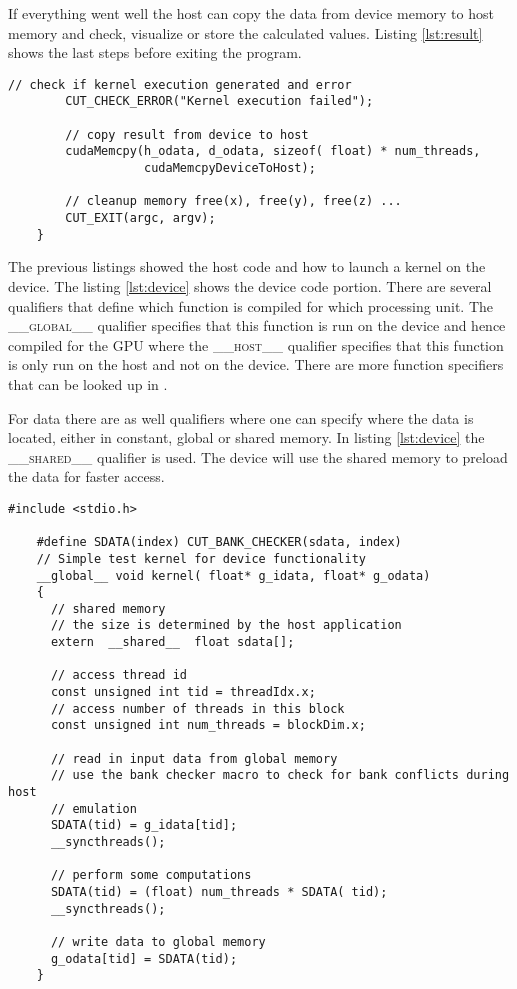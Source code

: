 If everything went well the host can copy the data from device memory
to host memory and check, visualize or store the calculated values. Listing
\ref{lst:result} shows the last steps before exiting the program.


\begin{lstlisting}[caption=Retrieving of the Results, label=lst:result]
	    // check if kernel execution generated and error
	    CUT_CHECK_ERROR("Kernel execution failed");
 
	    // copy result from device to host
	    cudaMemcpy(h_odata, d_odata, sizeof( float) * num_threads, 
			       cudaMemcpyDeviceToHost);

	    // cleanup memory free(x), free(y), free(z) ...
		CUT_EXIT(argc, argv);
	}
\end{lstlisting}



The previous listings showed the host code and how to launch a kernel on the
device. The listing \ref{lst:device} shows the device code portion. There are
several qualifiers that define which function is compiled for which processing
unit. The \textsc{\_\_global\_\_} qualifier specifies that this function is run
on the device and hence compiled for the \gls{GPU} where the \textsc{\_\_host\_\_}
qualifier specifies that this function is only run on the host and not on the
device. There are more function specifiers that can be looked up in
\cite{citeulike:3325943}.

For data there are as well qualifiers where one can specify where the data is
located, either in constant, global or shared memory. In listing
\ref{lst:device} the \textsc{\_\_shared\_\_} qualifier is used. The device will
use the shared memory to preload the data for faster access.


\begin{lstlisting}[caption=CUDA device code, label=lst:device]
	#include <stdio.h>

	#define SDATA(index) CUT_BANK_CHECKER(sdata, index)
	// Simple test kernel for device functionality
	__global__ void kernel( float* g_idata, float* g_odata) 
	{
	  // shared memory
	  // the size is determined by the host application
	  extern  __shared__  float sdata[];

	  // access thread id
	  const unsigned int tid = threadIdx.x;
	  // access number of threads in this block
	  const unsigned int num_threads = blockDim.x;

	  // read in input data from global memory
	  // use the bank checker macro to check for bank conflicts during host
	  // emulation
	  SDATA(tid) = g_idata[tid];
	  __syncthreads();

	  // perform some computations
	  SDATA(tid) = (float) num_threads * SDATA( tid);
	  __syncthreads();

	  // write data to global memory
	  g_odata[tid] = SDATA(tid);
	}

\end{lstlisting}


